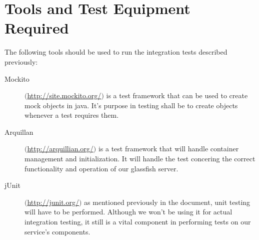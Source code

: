 \section{Tools and Test Equipment Required}

The following tools should be used to run the integration tests described previously:

\begin{description}

	\item[Mockito] $($\url{http://site.mockito.org/}$)$ is a test framework that can be used to create mock objects in java. It's purpose in testing shall be to create objects whenever
	a test requires them.
	
	\item[Arquillan] $($\url{http://arquillian.org/}$)$ is a test framework that will handle container management and initialization. It will handle the test concering the correct functionality
	and operation of our glassfish server.
	
	\item[jUnit] $($\url{http://junit.org/}$)$ as mentioned previously in the document, unit testing will have to be performed. Although we won't be using it for actual integration testing, it still
	is a vital component in performing tests on our service's components.
	
\end{description}